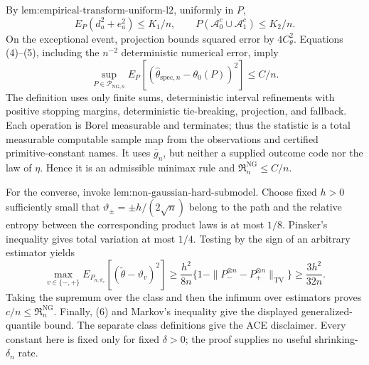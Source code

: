 By \(\text{lem:empirical-transform-uniform-l2}\), uniformly in \(P\),
\[
 E_P(d_a^2+e_a^2)\le K_1/n,
 \qquad
 P(\mathcal A_0^c\cup\mathcal A_1^c)\le K_2/n. \tag{5}
\]
On the exceptional event, projection bounds squared error by \(4C_{\theta}^2\).  Equations (4)--(5), including the \(n^{-2}\) deterministic numerical error, imply
\[
 \sup_{P\in\mathcal P_{\mathrm{NG},n}}
 E_P[(\widehat\theta_{\mathrm{spec},n}-\theta_0(P))^2]
 \le C/n. \tag{6}
\]
The definition uses only finite sums, deterministic interval refinements with positive stopping margins, deterministic tie-breaking, projection, and fallback.  Each operation is Borel measurable and terminates; thus the statistic is a total measurable computable sample map from the observations and certified primitive-constant names.  It uses \(\bar g_n\), but neither a supplied outcome code nor the law of \(\eta\).  Hence it is an admissible minimax rule and \(\mathfrak R_n^{\mathrm{NG}}\le C/n\).

For the converse, invoke \(\text{lem:non-gaussian-hard-submodel}\).  Choose fixed \(h>0\) sufficiently small that \(\vartheta_{\pm}=\pm h/(2\sqrt n)\) belong to the path and the relative entropy between the corresponding product laws is at most \(1/8\).  Pinsker's inequality gives total variation at most \(1/4\).  Testing by the sign of an arbitrary estimator yields
\[
 \max_{v\in\{-,+\}}E_{P_{n,\vartheta_v}}
 [ (\widetilde\theta-\vartheta_v)^2]
 \ge\frac{h^2}{8n}
 \{1-\|P_-^{\otimes n}-P_+^{\otimes n}\|_{\mathrm{TV}}\}
 \ge\frac{3h^2}{32n}.
\]
Taking the supremum over the class and then the infimum over estimators proves \(c/n\le\mathfrak R_n^{\mathrm{NG}}\).  Finally, (6) and Markov's inequality give the displayed generalized-quantile bound.  The separate class definitions give the ACE disclaimer.  Every constant here is fixed only for fixed \(\delta>0\); the proof supplies no useful shrinking-\(\delta_n\) rate.